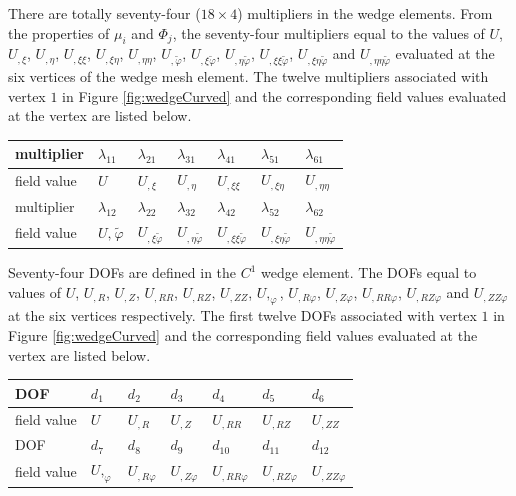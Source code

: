 \documentclass[11pt]{article}  %
\begin{document}
There are totally seventy-four ($18\times4$) multipliers in the wedge elements. From the properties of $\mu_i$ and $\Phi_j$, the seventy-four multipliers  equal to the values of $U$,  $U_{,\xi}$,  $U_{,\eta}$, $U_{,\xi\xi}$,  $U_{,\xi\eta}$, $U_{,\eta\eta}$,  $U_{,\tilde{\varphi}}$, $U_{,\xi\tilde{\varphi}}$, $U_{,\eta\tilde{\varphi}}$, $U_{,\xi\xi\tilde{\varphi}}$, $U_{,\xi\eta\tilde{\varphi}}$ and $U_{,\eta\eta\tilde{\varphi}}$ evaluated at the six vertices of the wedge mesh element. The twelve multipliers associated with vertex $1$ in Figure \ref{fig:wedgeCurved} and the corresponding field values evaluated at the vertex are listed below.
\begin{center}
 \begin{tabular}{ |l|l|l|l|l|l|l|}
\hline
 multiplier & $\lambda_{11}$ & $\lambda_{21}$ & $\lambda_{31}$ & $\lambda_{41}$ & $\lambda_{51}$ &$\lambda_{61}$  \\ \hline
 field value & $U$ & $U_{,\xi}$ & $U_{,\eta}$ & $U_{,\xi\xi}$ & $U_{,\xi\eta}$ &$U_{,\eta\eta}$  \\ \hline
 multiplier & $\lambda_{12}$ & $\lambda_{22}$ & $\lambda_{32}$ & $\lambda_{42}$ & $\lambda_{52}$ &$\lambda_{62}$  \\ \hline
 field value & $U,_{}\tilde{\varphi}$ & $U_{,\xi\tilde{\varphi}}$ & $U_{,\eta\tilde{\varphi}}$ & $U_{,\xi\xi\tilde{\varphi}}$ & $U_{,\xi\eta\tilde{\varphi}}$ &$U_{,\eta\eta\tilde{\varphi}}$  \\ \hline
\end{tabular}
\end{center}
 
Seventy-four DOFs are defined in the $C^1$ wedge element. The DOFs equal to values of  $U$, $U_{,R}$, $U_{,Z}$, $U_{,RR}$, $U_{,RZ}$, $U_{,ZZ}$, $U,_{\varphi}$, $U_{,R\varphi}$, $U_{,Z\varphi}$, $U_{,RR\varphi}$, $U_{,RZ\varphi}$ and $U_{,ZZ\varphi}$ at the six vertices respectively. The first twelve DOFs associated with vertex $1$  in Figure \ref{fig:wedgeCurved}  and the corresponding field values evaluated at the vertex  are listed below.
\begin{center}
 \begin{tabular}{ |l|l|l|l|l|l|l|}
\hline
 DOF& $d_1$ & $d_2$ & $d_3$ & $d_4$ & $d_5$ &$d_6$  \\ \hline
 field value & $U$ & $U_{,R}$ & $U_{,Z}$ & $U_{,RR}$ & $U_{,RZ}$ &$U_{,ZZ}$  \\ \hline
  DOF& $d_7$ & $d_8$ & $d_9$ & $d_{10}$ & $d_{11}$ &$d_{12}$  \\ \hline
 field value & $U,_{\varphi}$ & $U_{,R\varphi}$ & $U_{,Z\varphi}$ & $U_{,RR\varphi}$ & $U_{,RZ\varphi}$ &$U_{,ZZ\varphi}$  \\ \hline
\end{tabular}
\end{center}
\end{document}
